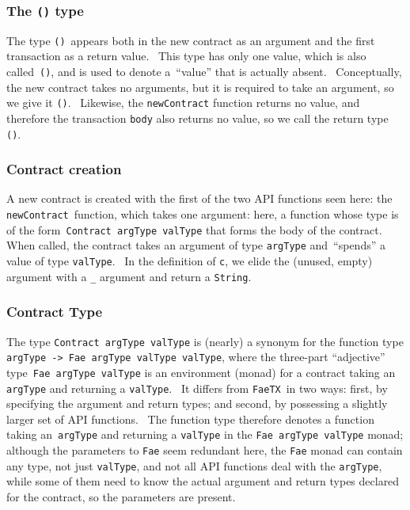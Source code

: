 \documentclass[11pt]{article}
\begin{document}
\subsubsection{The \texttt{()} type}
\vspace{5.5pt}

The type \texttt{()} appears both in the new contract as an argument and the first transaction as a return value.  This type has only one value, which is also called \texttt{()}, and is used to denote a “value” that is actually absent.  Conceptually, the new contract takes no arguments, but it is required to take an argument, so we give it \texttt{()}.  Likewise, the \texttt{newContract} function returns no value, and therefore the transaction \texttt{body} also returns no value, so we call the return type \texttt{()}.

\subsubsection{Contract creation}
\vspace{5.5pt}

A new contract is created with the first of the two API functions seen here: the \texttt{newContract} function, which takes one argument: here, a function whose type is of the form \texttt{Contract argType valType} that forms the body of the contract.  When called, the contract takes an argument of type \texttt{argType} and “spends” a value of type \texttt{valType}.  In the definition of \texttt{c}, we elide the (unused, empty) argument with a \texttt{\_} argument and return a \texttt{String}.

\subsubsection{Contract Type}
\vspace{5.5pt}

The type \texttt{Contract argType valType} is (nearly) a synonym for the function type \texttt{argType -}\texttt{\textgreater{}}\texttt{ Fae argType valType valType}, where the three-part “adjective” type \texttt{Fae argType valType} is an environment (monad) for a contract taking an \texttt{argType} and returning a \texttt{valType}.  It differs from \texttt{FaeTX} in two ways: first, by specifying the argument and return types; and second, by possessing a slightly larger set of API functions.  The function type therefore denotes a function taking an \texttt{argType} and returning a \texttt{valType} in the \texttt{Fae argType valType} monad; although the parameters to \texttt{Fae} seem redundant here, the \texttt{Fae} monad can contain any type, not just \texttt{valType}, and not all API functions deal with the \texttt{argType}, while some of them need to know the actual argument and return types declared for the contract, so the parameters are present.
\end{document}
